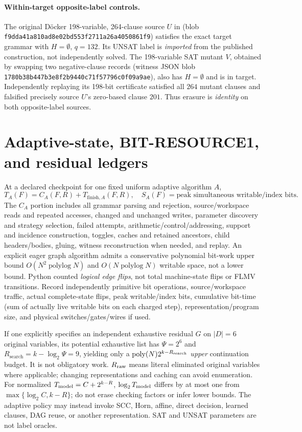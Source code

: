 \documentclass[11pt]{article}
\begin{document}
\paragraph{Within-target opposite-label controls.}
The original D\"ocker 198-variable, 264-clause source $U$ in  (blob \texttt{f9dda41a810ad8e02bd553f2711a26a4050861f9}) satisfies the exact target grammar with $H=\emptyset$, $q=132$. Its UNSAT label is \emph{imported} from the published construction, not independently solved. The 198-variable SAT mutant $V$, obtained by swapping two negative-clause records (witness JSON blob \texttt{1780b38b447b3e8f2b9440c71f57796c0f09a9ae}), also has $H=\emptyset$ and is in target. Independently replaying its 198-bit certificate satisfied all $264$ mutant clauses and falsified precisely source $U$'s zero-based clause $201$. Thus erasure is \emph{identity} on both opposite-label sources.

\section{Adaptive-state, BIT-RESOURCE1, and residual ledgers}
At a declared checkpoint for one fixed uniform adaptive algorithm $A$,
\[
T_A(F)=C_A(F,R)+T_{\mathrm{finish},A}(F,R),\quad
S_A(F)=\text{peak simultaneous writable/index bits}.
\]
The $C_A$ portion includes all grammar parsing and rejection, source/workspace reads and repeated accesses, changed and unchanged writes, parameter discovery and strategy selection, failed attempts, arithmetic/control/addressing, support and incidence construction, toggles, caches and retained ancestors, child headers/bodies, gluing, witness reconstruction when needed, and replay. An explicit eager graph algorithm admits a conservative polynomial bit-work upper bound $O(N^2\operatorname{polylog}N)$ and $O(N\operatorname{polylog}N)$ writable space, not a lower bound. Python counted \emph{logical edge flips}, not total machine-state flips or FLMV transitions. Record independently primitive bit operations, source/workspace traffic, actual complete-state flips, peak writable/index bits, cumulative bit-time (sum of actually live writable bits on each charged step), representation/program size, and physical switches/gates/wires if used.

If one explicitly specifies an independent exhaustive residual $G$ on $|D|=6$ original variables, its potential exhaustive list has $\Psi=2^6$ and $R_{\mathrm{search}}=k-\log_2\Psi=9$, yielding only a $\operatorname{poly}(N)2^{k-R_{\rm search}}$ \emph{upper} continuation budget. It is not obligatory work. $R_{\rm raw}$ means literal eliminated original variables where applicable; changing representations and caching can avoid enumeration. For normalized $T_{\rm model}=C+2^{k-R}$, $\log_2 T_{\rm model}$ differs by at most one from $\max\{\log_2C,k-R\}$; do not erase checking factors or infer lower bounds. The adaptive policy may instead invoke SCC, Horn, affine, direct decision, learned clauses, DAG reuse, or another representation. SAT and UNSAT parameters are not label oracles.
\end{document}
